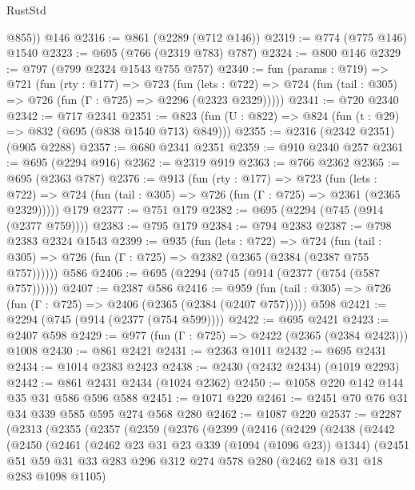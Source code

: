 \begin{lexlean}{RustStd}
\begin{coremodule}
{\begin{coremodule}
{{{{{{{{{        @855))
    @146
@2316 := @861 (@2289 (@712 @146))
@2319 := @774 (@775 @146) @1540
@2323 := @695 (@766 (@2319 @783) @787)
@2324 := @800 @146
@2329 := @797 (@799 @2324 @1543 @755 @757)
@2340 := fun (params : @719) =>
  @721
    (fun (rty : @177) =>
    @723
      (fun (lets : @722) =>
      @724 (fun (tail : @305) => @726 (fun (Γ : @725) => @2296 (@2323 @2329)))))
@2341 := @720 @2340
@2342 := @717 @2341
@2351 := @823 (fun (U : @822) => @824 (fun (t : @29) => @832 (@695 (@838 @1540 @713) @849)))
@2355 := @2316 (@2342 @2351) (@905 @2288)
@2357 := @680 @2341 @2351
@2359 := @910 @2340 @257
@2361 := @695 (@2294 @916)
@2362 := @2319 @919
@2363 := @766 @2362
@2365 := @695 (@2363 @787)
@2376 := @913
    (fun (rty : @177) =>
    @723
      (fun (lets : @722) =>
      @724 (fun (tail : @305) => @726 (fun (Γ : @725) => @2361 (@2365 @2329)))))
    @179
@2377 := @751 @179
@2382 := @695 (@2294 (@745 (@914 (@2377 @759))))
@2383 := @795 @179
@2384 := @794 @2383
@2387 := @798 @2383 @2324 @1543
@2399 := @935
    (fun (lets : @722) =>
    @724 (fun (tail : @305) => @726 (fun (Γ : @725) => @2382 (@2365 (@2384 (@2387 @755 @757))))))
    @586
@2406 := @695 (@2294 (@745 (@914 (@2377 (@754 (@587 @757))))))
@2407 := @2387 @586
@2416 := @959
    (fun (tail : @305) => @726 (fun (Γ : @725) => @2406 (@2365 (@2384 (@2407 @757)))))
    @598
@2421 := @2294 (@745 (@914 (@2377 (@754 @599))))
@2422 := @695 @2421
@2423 := @2407 @598
@2429 := @977 (fun (Γ : @725) => @2422 (@2365 (@2384 @2423))) @1008
@2430 := @861 @2421
@2431 := @2363 @1011
@2432 := @695 @2431
@2434 := @1014 @2383 @2423
@2438 := @2430 (@2432 @2434) (@1019 @2293)
@2442 := @861 @2431 @2434 (@1024 @2362)
@2450 := @1058 @220 @142 @144 @35 @31 @586 @596 @588
@2451 := @1071 @220
@2461 := @2451 @70 @76 @31 @34 @339 @585 @595 @274 @568 @280
@2462 := @1087 @220
@2537 := @2287
    (@2313
      (@2355
        (@2357
          (@2359
            (@2376
              (@2399
                (@2416
                  (@2429
                    (@2438
                      (@2442
                        (@2450
                          (@2461
                            (@2462 @23 @31 @23 @339 (@1094 (@1096 @23)) @1344)
                            (@2451
                              @51
                              @59
                              @31
                              @33
                              @283
                              @296
                              @312
                              @274
                              @578
                              @280
                              (@2462 @18 @31 @18 @283 @1098 @1105)
}}}}}}}}}
\end{coremodule}}
\end{coremodule}
\end{lexlean}
